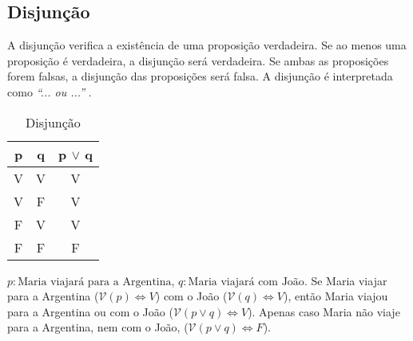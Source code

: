 \subsection*{Disjunção}
A disjunção verifica a existência de uma proposição verdadeira. Se ao menos uma proposição é verdadeira, a disjunção será verdadeira. Se ambas as proposições forem falsas, a disjunção das proposições será falsa. A disjunção é interpretada como \textit{``... ou ...''} .
\begin{table}[H]
\centering
\caption{Disjunção}
\label{or}
\begin{tabular}{c|c|c}
\textbf{p} & \textbf{q} & \textbf{p $\vee$ q} \\ \hline
V          & V          & V             \\
V          & F          & V             \\
F          & V          & V             \\
F          & F          & F            
\end{tabular}
\end{table}
\begin{exemplo}
$p:\text{Maria viajará para a Argentina}$, $q:\text{Maria viajará com João}$. Se Maria viajar para a Argentina ($\mathcal{V}(p) \Leftrightarrow V$) com o João ($\mathcal{V}(q) \Leftrightarrow V$), então Maria viajou para a Argentina ou com o João ($\mathcal{V}(p \vee q) \Leftrightarrow V$). Apenas caso Maria não viaje para a Argentina, nem com o João, ($\mathcal{V}(p \vee q) \Leftrightarrow F$).
\end{exemplo}

